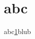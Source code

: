 \documentclass{article}
\begin{document}
\tagpdfparaOff
{}%
\section{abc}\label{abc}
\tagmcend\tagstructend
\tagpdfparaOn


abc\ref{abc}blub
\end{document}
